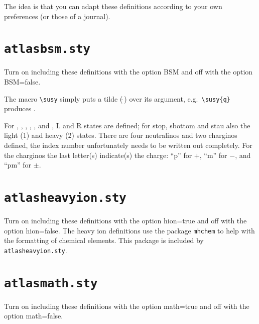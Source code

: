 \documentclass[UKenglish,texlive=2013]{latex/atlasdoc}
\newcommand{\File}[1]{\texttt{#1}\xspace}
\newcommand{\Macro}[1]{\texttt{\textbackslash #1}\xspace}
\newcommand{\Option}[1]{\textsf{#1}\xspace}
\newcommand{\Package}[1]{\texttt{#1}\xspace}
\begin{document}
{The idea is that you can adapt these definitions according to your own preferences (or those of a journal).


\newpage
\section{\File{atlasbsm.sty}}

Turn on including these definitions with the option \Option{BSM} and off with the option \Option{BSM=false}.

The macro \Macro{susy} simply puts a tilde ($\tilde{\ }$) over its argument,
e.g.\ \verb|\susy{q}| produces .

For , , , \slepton, \sel, \smu and
\stau, L and R states are defined; for stop, sbottom and stau also the
light (1) and heavy (2) states.
There are four neutralinos and two charginos defined, 
the index number unfortunately needs to be written out completely. 
For the charginos the last letter(s) indicate(s) the charge: 
\enquote{p} for $+$, \enquote{m} for $-$, and \enquote{pm} for $\pm$.




\newpage
\section{\File{atlasheavyion.sty}}

Turn on including these definitions with the option \Option{hion=true} and off with the option \Option{hion=false}.
The heavy ion definitions use the package \Package{mhchem} to help with the formatting of chemical elements.
This package is included by \File{atlasheavyion.sty}.



%
%


\newpage
\section{\File{atlasmath.sty}}

Turn on including these definitions with the option \Option{math=true} and off with the option \Option{math=false}.

}
\end{document}
